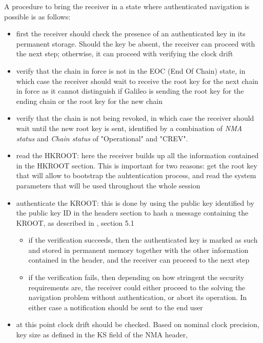 A procedure to bring the receiver in a state where authenticated navigation is
possible is as follows:
\begin{itemize}
  \item first the receiver should check the presence of an authenticated key in
    its permanent storage. Should the key be absent, the receiver can proceed
    with the next step; otherwise, it can proceed with verifying the clock drift
  \item verify that the chain in force is not in the EOC (End Of Chain) state,
    in which case the receiver should wait to receive the root key for the next
    chain in force as it cannot distinguish if Galileo is sending the root key
    for the ending chain or the root key for the new chain
  \item verify that the chain is not being revoked, in which case the receiver
    should wait until the new root key is sent, identified by a combination of
    \textit{NMA status} and \textit{Chain status} of "Operational" and "CREV".
  \item read the HKROOT: here the receiver builds up all the information contained
    in the HKROOT section. This is important for two reasons: get the root key
    that will allow to bootstrap the auhtentication process, and read the system
    parameters that will be used throughout the whole session
  \item authenticate the KROOT: this is done by using the public key identified
    by the public key ID in the headers section to hash a message containing the
    KROOT, as described in \cite{osnma}, section 5.1
    \begin{itemize}
      \item if the verification succeeds, then the authenticated key is marked
        as such and stored in permanent memory together with the other
        information contained in the header, and the receiver can proceed to
        the next step
      \item if the verification fails, then depending on how stringent the
        security requirements are, the receiver could either proceed to the
        solving the navigation problem without authentication, or abort its
        operation. In either case a notification should be sent to the end user
    \end{itemize}
  \item at this point clock drift should be checked. Based on nominal clock
    precision, key size as defined in the \textrm{KS} field of the NMA header,

\end{itemize}
